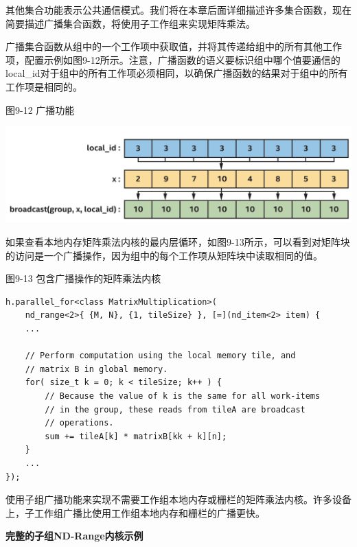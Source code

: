 其他集合功能表示公共通信模式。我们将在本章后面详细描述许多集合函数，现在简要描述广播集合函数，将使用子工作组来实现矩阵乘法。\par

广播集合函数从组中的一个工作项中获取值，并将其传递给组中的所有其他工作项，配置示例如图9-12所示。注意，广播函数的语义要标识组中哪个值要通信的local\_id对于组中的所有工作项必须相同，以确保广播函数的结果对于组中的所有工作项是相同的。\par

\hspace*{\fill} \par %
图9-12 广播功能
\begin{center}
	\includegraphics[width=1.\textwidth]{content/chapter-9/images/7}
\end{center}

如果查看本地内存矩阵乘法内核的最内层循环，如图9-13所示，可以看到对矩阵块的访问是一个广播操作，因为组中的每个工作项从矩阵块中读取相同的值。\par

\hspace*{\fill} \par %
图9-13 包含广播操作的矩阵乘法内核
\begin{lstlisting}[caption={}]
h.parallel_for<class MatrixMultiplication>(
	nd_range<2>{ {M, N}, {1, tileSize} }, [=](nd_item<2> item) {
	...
	
	// Perform computation using the local memory tile, and
	// matrix B in global memory.
	for( size_t k = 0; k < tileSize; k++ ) {
		// Because the value of k is the same for all work-items
		// in the group, these reads from tileA are broadcast
		// operations.
		sum += tileA[k] * matrixB[kk + k][n];
	}
	...
});
\end{lstlisting}

使用子组广播功能来实现不需要工作组本地内存或栅栏的矩阵乘法内核。许多设备上，子工作组广播比使用工作组本地内存和栅栏的广播更快。\par

\hspace*{\fill} \par %
\textbf{完整的子组ND-Range内核示例}

